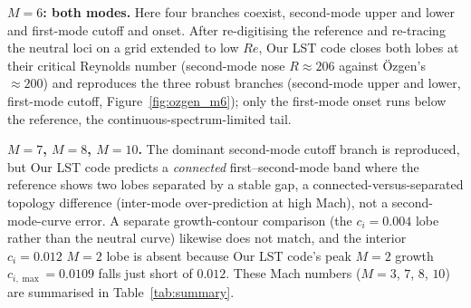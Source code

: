 \documentclass[11pt]{article}
\begin{document}
\noindent\textbf{$M=6$: both modes.} Here four branches coexist, second-mode upper and lower and
first-mode cutoff and onset. After re-digitising the reference and re-tracing the neutral loci on a
grid extended to low $Re$, Our LST code closes both lobes at their critical Reynolds number
(second-mode nose $R\!\approx\!206$ against \"Ozgen's $\approx\!200$) and reproduces the three robust
branches (second-mode upper and lower, first-mode cutoff, Figure~\ref{fig:ozgen_m6}); only the
first-mode onset runs below the reference, the continuous-spectrum-limited tail.

\noindent\textbf{$M=7$, $M=8$, $M=10$.} The dominant second-mode cutoff branch is reproduced, but Our
LST code predicts a \emph{connected} first--second-mode band where the reference shows two lobes
separated by a stable gap, a connected-versus-separated topology difference (inter-mode
over-prediction at high Mach), not a second-mode-curve error. A separate growth-contour comparison
(the $c_i=0.004$ lobe rather than the neutral curve) likewise does not match, and the interior
$c_i=0.012$ $M=2$ lobe is absent because Our LST code's peak $M=2$ growth $c_{i,\max}=0.0109$ falls
just short of $0.012$. These Mach numbers ($M=3$, $7$, $8$, $10$) are summarised in
Table~\ref{tab:summary}.

\FloatBarrier
\end{document}
